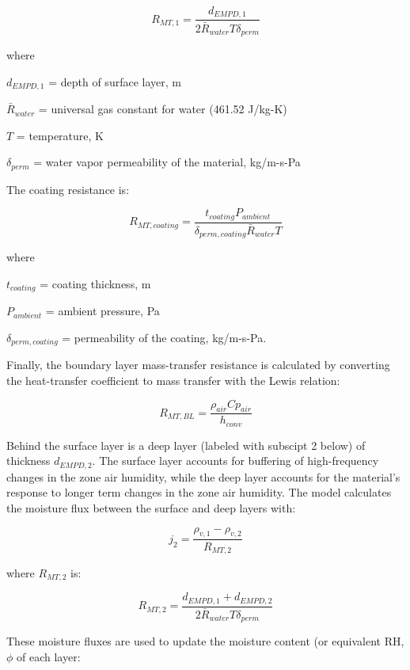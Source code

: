 \begin{equation}
R_{MT,1} = \frac{d_{EMPD,1}} {2 \bar R_{water} T \delta_{perm}}
\end{equation}

where

\(d_{EMPD,1}\) = depth of surface layer, m

\(\bar R_{water}\) = universal gas constant for water (461.52 J/kg-K)

\(T\) = temperature, K

\(\delta_{perm}\) = water vapor permeability of the material, kg/m-s-Pa

The coating resistance is:

\begin{equation}
R_{MT,coating} = \frac {t_{coating} P_{ambient}} {\delta_{perm,coating} \bar R_{water} T}
\end{equation}

where

\(t_{coating}\) = coating thickness, m

\(P_{ambient}\) = ambient pressure, Pa

\(\delta_{perm,coating}\) = permeability of the coating, kg/m-s-Pa.

Finally, the boundary layer mass-transfer resistance is calculated by converting the heat-transfer coefficient to mass transfer with the Lewis relation:

\begin{equation}
R_{MT,BL} = \frac{\rho_{air} Cp_{air}}{h_{conv}}
\end{equation}

Behind the surface layer is a deep layer (labeled with subscipt 2 below) of thickness \(d_{EMPD,2}\). The surface layer accounts for buffering of high-frequency changes in the zone air humidity, while the deep layer accounts for the material's response to longer term changes in the zone air humidity. The model calculates the moisture flux between the surface and deep layers with:

\begin{equation}
j_{2} = \frac {\rho_{v,1} - \rho_{v,2}} {R_{MT,2}}
\end{equation}

where \(R_{MT,2}\) is:

\begin{equation}
R_{MT,2} = \frac {d_{EMPD,1} + d_{EMPD,2}} {2 \bar R_{water} T \delta_{perm} }
\end{equation}

These moisture fluxes are used to update the moisture content (or equivalent RH, \(\phi\) of each layer:

